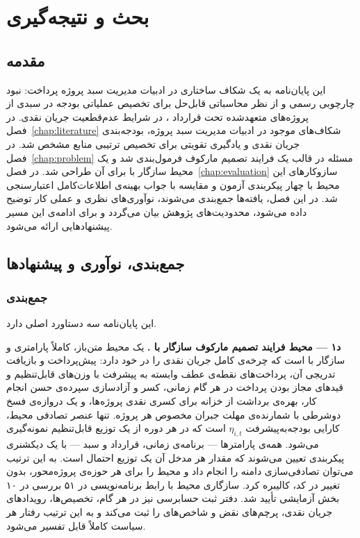 \chapter{بحث و نتیجه‌گیری}
\label{chap:discussion}

\section{مقدمه}

این پایان‌نامه به یک شکاف ساختاری در ادبیات مدیریت سبد پروژه پرداخت:
نبود چارچوبی رسمی و از نظر محاسباتی قابل‌حل برای تخصیص عملیاتی
بودجه در سبدی از پروژه‌های متعهدشده تحت قرارداد ، در
شرایط عدم‌قطعیت جریان نقدی. در فصل~\ref{chap:literature} شکاف‌های
موجود در ادبیات مدیریت سبد پروژه، بودجه‌بندی جریان نقدی و یادگیری
تقویتی برای تخصیص ترتیبی منابع مشخص شد. در فصل~\ref{chap:problem}
مسئله در قالب یک فرایند تصمیم مارکوف فرمول‌بندی شد و یک محیط
سازگار با  برای آن طراحی شد. در
فصل~\ref{chap:evaluation} سازوکارهای این محیط با چهار پیکربندی
آزمون و مقایسه با جواب بهینه‌ی اطلاعات‌کامل اعتبارسنجی شد. در این
فصل، یافته‌ها جمع‌بندی می‌شوند، نوآوری‌های نظری و عملی کار توضیح
داده می‌شود، محدودیت‌های پژوهش بیان می‌گردد و برای ادامه‌ی این
مسیر پیشنهادهایی ارائه می‌شود.

\section{جمع‌بندی، نوآوری و پیشنهادها}

\subsection{جمع‌بندی}
\label{subsec:summary}

این پایان‌نامه سه دستاورد اصلی دارد.

\textbf{د۱ — محیط فرایند تصمیم مارکوف سازگار با .}
 یک محیط متن‌باز، کاملاً پارامتری
و سازگار با  است که چرخه‌ی کامل جریان نقدی
 را در خود دارد: پیش‌پرداخت و بازیافت تدریجی آن،
پرداخت‌های نقطه‌ی عطف وابسته به پیشرفت با وزن‌های قابل‌تنظیم و
قیدهای مجاز بودن پرداخت در هر گام زمانی، کسر و آزادسازی سپرده‌ی
حسن انجام کار، بهره‌ی برداشت از خزانه برای کسری نقدی پروژه‌ها، و
یک دروازه‌ی فسخ دوشرطی با شمارنده‌ی مهلت جبران مخصوص هر پروژه. تنها
عنصر تصادفی محیط، کارایی بودجه‌به‌پیشرفت $\eta_{i,t}$ است که در هر
دوره از یک توزیع قابل‌تنظیم نمونه‌گیری می‌شود. همه‌ی پارامترها —
برنامه‌ی زمانی، قرارداد و سبد — با یک دیکشنری پیکربندی تعیین
می‌شوند که مقدار هر مدخل آن یک توزیع احتمال است. به این ترتیب
می‌توان تصادفی‌سازی دامنه را انجام داد و محیط را برای هر حوزه‌ی
پروژه‌محور، بدون تغییر در کد، کالیبره کرد. سازگاری محیط با رابط
برنامه‌نویسی  در ۵۱ بررسی در ۱۰ بخش آزمایشی تأیید
شد. دفتر ثبت حسابرسی  نیز در هر گام، تخصیص‌ها،
رویدادهای جریان نقدی، پرچم‌های نقض و شاخص‌های  را ثبت
می‌کند و به این ترتیب رفتار هر سیاست کاملاً قابل تفسیر می‌شود.

